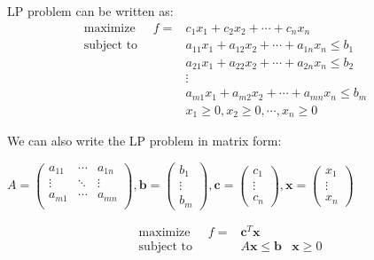 \documentclass[9pt]{article}
\begin{document}
\vspace{-9pt}
\begin{multicols}{2}

    LP problem can be written as:
    \[
    \begin{aligned}
        \text{maximize} \quad \ \ f = & c_1x_1 + c_2x_2 + \cdots + c_nx_n & \\
        \text{subject to} \quad \qquad & a_{11}x_1 + a_{12}x_2 + \cdots + a_{1n}x_n \leq b_1 & \\
                                & a_{21}x_1 + a_{22}x_2 + \cdots + a_{2n}x_n \leq b_2 & \\
                                & \vdots & \\
                                & a_{m1}x_1 + a_{m2}x_2 + \cdots + a_{mn}x_n \leq b_m & \\
                                & x_1 \geq 0, x_2 \geq 0, \cdots, x_n \geq 0 &
    \end{aligned}
    \]
    
    \columnbreak

    We can also write the LP problem in matrix form:

    \vspace{5pt}
    $
    A=
    \begin{pmatrix}
        a_{11} & \cdots & a_{1n} \\
        \vdots & \ddots & \vdots \\
        a_{m1} & \cdots & a_{mn} \\
    \end{pmatrix}
    ,\mathbf{b}=
    \begin{pmatrix}
        b_1 \\
        \vdots \\
        b_m
    \end{pmatrix}
    ,\mathbf{c}=
    \begin{pmatrix}
        c_1 \\
        \vdots \\
        c_n
    \end{pmatrix}
    ,\mathbf{x}=
    \begin{pmatrix}
        x_1 \\
        \vdots \\
        x_n
    \end{pmatrix}
    $

    \[
    \begin{aligned}
        \text{maximize} \quad \ \ f = & \mathbf{c}^T\mathbf{x} & \\
        \text{subject to} \quad \qquad & A\mathbf{x} \leq \mathbf{b} & \mathbf{x} \geq 0 \\
    \end{aligned}
    \]
\end{multicols}
\end{document}
